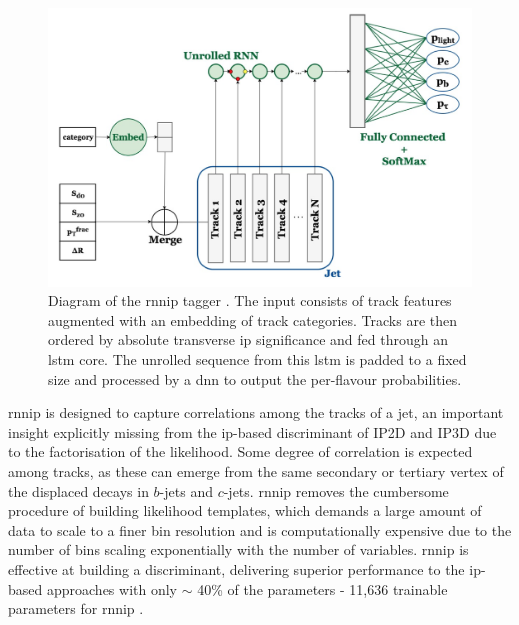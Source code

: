 \begin{figure}[h!]
  \center
  \includegraphics[scale=0.6]{Images/FTAG/rnnip_structure.png}
  \caption{Diagram of the \gls{rnnip} tagger \cite{Paganini:2289214}. The input consists of track features augmented with an embedding of track categories. Tracks are then ordered by absolute transverse \gls{ip} significance and fed through an \gls{lstm} core. The unrolled sequence from this \gls{lstm} is padded to a fixed size and processed by a \gls{dnn} to output the per-flavour probabilities.} 
  \label{fig:rnnipModel}
\end{figure}

\gls{rnnip} is designed to capture correlations among the tracks of a jet, an important insight explicitly missing from the \gls{ip}-based discriminant of IP2D and IP3D due to the factorisation of the likelihood. Some degree of correlation is expected among tracks, as these can emerge from the same secondary or tertiary vertex of the displaced decays in $b$-jets and $c$-jets. \gls{rnnip} removes the cumbersome procedure of building likelihood templates, which demands a large amount of data to scale to a finer bin resolution and is computationally expensive due to the number of bins scaling exponentially with the number of variables. \gls{rnnip} is effective at building a discriminant, delivering superior performance to the \gls{ip}-based approaches with only $\sim$ 40\% of the parameters - 11,636 trainable parameters for \gls{rnnip} \cite{Paganini:2289214}.

